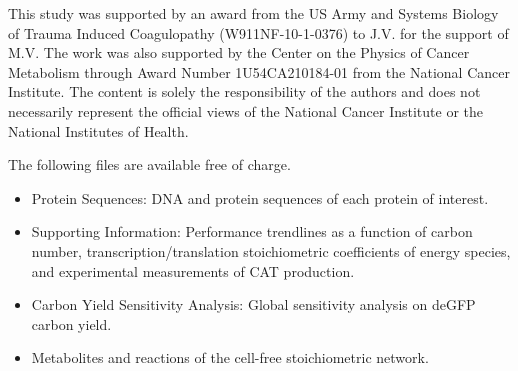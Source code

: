 \documentclass[journal=asbcd6,manuscript=article]{achemso}
\begin{document}
\begin{acknowledgement}

This study was supported by an award from the US Army and Systems Biology of Trauma Induced Coagulopathy (W911NF-10-1-0376) to J.V. for the support of M.V.
The work was also supported by the Center on the Physics of Cancer Metabolism through Award Number 1U54CA210184-01 from the National Cancer Institute.
The content is solely the responsibility of the authors and does not necessarily represent the official views of the National Cancer Institute or the National Institutes of Health.

\end{acknowledgement}

\begin{suppinfo}
The following files are available free of charge.
\begin{itemize}
  \item Protein Sequences: DNA and protein sequences of each protein of interest.
  \item Supporting Information: Performance trendlines as a function of carbon number, transcription/translation stoichiometric coefficients of energy species, and experimental measurements of CAT production.
  \item Carbon Yield Sensitivity Analysis: Global sensitivity analysis on deGFP carbon yield.
  \item Metabolites and reactions of the cell-free stoichiometric network.
\end{itemize}
\end{suppinfo}

\clearpage

\end{document}
